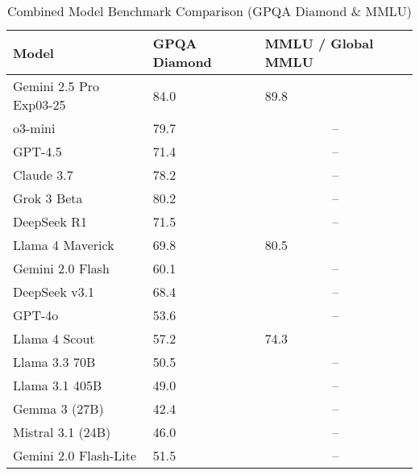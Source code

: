 \documentclass{scrartcl}
\begin{document}
\begin{table}[H]
    \setlength{\tabcolsep}{4pt}
    \begin{threeparttable}
        \caption{Combined Model Benchmark Comparison (GPQA Diamond \& MMLU)}
        \label{tab:combined-models}
        \small
        \begin{tabularx}{\textwidth}{@{} L T{2.1} T{2.1} @{}}
            \toprule
            \textbf{Model}          & \textbf{GPQA Diamond} & \textbf{MMLU / Global MMLU} \\
            \midrule
            Gemini 2.5 Pro Exp03-25 & 84.0                  & 89.8                        \\
            o3-mini                 & 79.7                  &       \\
            GPT-4.5                 & 71.4                  &       \\
            Claude 3.7              & 78.2                  &       \\
            Grok 3 Beta             & 80.2                  &       \\
            DeepSeek R1             & 71.5                  &       \\
            Llama 4 Maverick        & 69.8                  & 80.5                        \\
            Gemini 2.0 Flash        & 60.1                  &       \\
            DeepSeek v3.1           & 68.4                  &       \\
            GPT-4o                  & 53.6                  &       \\
            Llama 4 Scout           & 57.2                  & 74.3                        \\
            Llama 3.3 70B           & 50.5                  &       \\
            Llama 3.1 405B          & 49.0                  &       \\
            Gemma 3 (27B)           & 42.4                  &       \\
            Mistral 3.1 (24B)       & 46.0                  &       \\
            Gemini 2.0 Flash-Lite   & 51.5                  &       \\

\end{tabularx}
\end{threeparttable}
\end{table}
\end{document}
